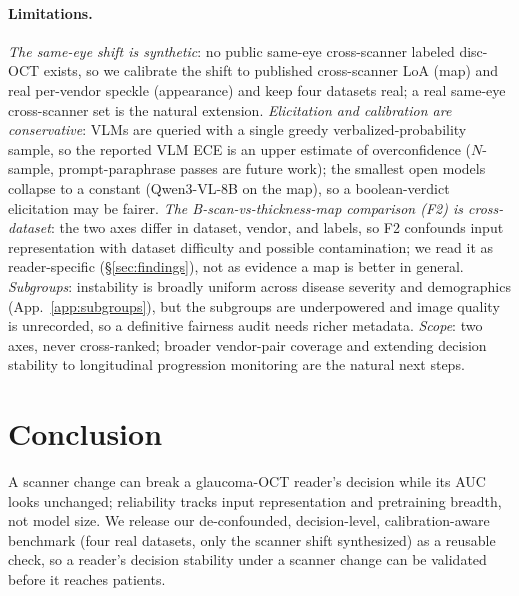 \paragraph{Limitations.} \emph{The same-eye shift is synthetic}: no public same-eye cross-scanner labeled disc-OCT
exists, so we calibrate the shift to published cross-scanner LoA (map) and real per-vendor speckle (appearance) and
keep four datasets real; a real same-eye cross-scanner set is the natural extension. \emph{Elicitation and
calibration are conservative}: VLMs are queried with a single greedy verbalized-probability sample, so the reported
VLM ECE is an upper estimate of overconfidence ($N$-sample, prompt-paraphrase passes are future work); the smallest
open models collapse to a constant (Qwen3-VL-8B on the map), so a boolean-verdict elicitation may be fairer.
\emph{The B-scan-vs-thickness-map comparison (F2) is cross-dataset}: the two axes differ in
dataset, vendor, and labels, so F2 confounds input representation with dataset difficulty and possible
contamination; we read it as reader-specific (\S\ref{sec:findings}), not as evidence a map is better in general.
\emph{Subgroups}: instability is broadly uniform across disease severity and demographics
(App.~\ref{app:subgroups}), but the subgroups are underpowered and image quality is unrecorded, so a definitive
fairness audit needs richer metadata. \emph{Scope}: two axes, never cross-ranked; broader vendor-pair coverage and
extending decision stability to longitudinal progression monitoring are the natural next steps.

\section{Conclusion}
\label{sec:conclusion}

A scanner change can break a glaucoma-OCT reader's decision while its AUC looks unchanged; reliability tracks input
representation and pretraining breadth, not model size. We release our de-confounded, decision-level,
calibration-aware benchmark (four real datasets, only the scanner shift synthesized) as a reusable check, so a
reader's decision stability under a scanner change can be validated before it reaches patients.
